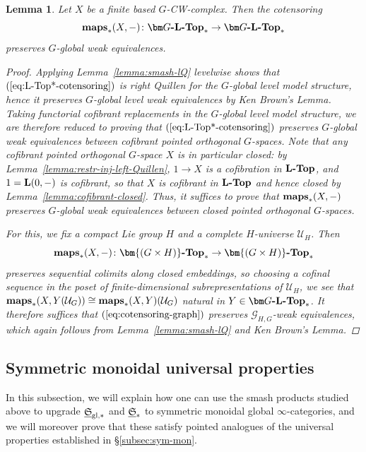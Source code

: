 \documentclass[reqno]{memo-l}
\theoremstyle{mythm}
\newtheorem{lemma}[thm]{Lemma}
\theoremstyle{definition}
\numberwithin{equation}{section}
\newcommand{\Uu}{{\mathcal{U}}}
\newcommand{\gl}{\textup{gl}}
\newcommand{\cat}[1]{\textbf{\textup{#1}}}
\newcommand{\maps}{\cat{maps}}
\newcommand{\ulhelper}[2]{\underline{\setbox0=\hbox{$#1#2$}\dp0=0.4pt \box0\relax}}
\newcommand{\ul}[1]{{\mathpalette\ulhelper{#1}}\hbox{\rule[-2pt]{0pt}{0pt}}}
\newcommand{\myS}{{{\mathfrak S\kern-.4pt}}}
\begin{document}
\begin{lemma}\label{lemma:cotensoring-fully-homotopical}
    Let $X$ be a finite based $G$-CW-complex. Then the cotensoring 
    \begin{equation}\label{eq:L-Top*-cotensoring}
        \maps_*(X,-)\colon\cat{$\bm G$-$\cat{L}$-Top}_*\to\cat{$\bm G$-$\cat{L}$-Top}_*
    \end{equation}
    preserves $G$-global weak equivalences. 
    \begin{proof}
        Applying Lemma~\ref{lemma:smash-lQ} levelwise shows that $(\ref{eq:L-Top*-cotensoring})$ is right Quillen for the $G$-global \emph{level} model structure, hence it preserves $G$-global level weak equivalences by Ken Brown's Lemma. Taking functorial cofibrant replacements in the $G$-global level model structure, we are therefore reduced to proving that $(\ref{eq:L-Top*-cotensoring})$ preserves $G$-global weak equivalences between cofibrant pointed orthogonal $G$-spaces. Note that any cofibrant pointed orthogonal $G$-space $X$ is in particular closed: by Lemma~\ref{lemma:restr-inj-left-Quillen}, $1\to X$ is a cofibration in $\cat{$\cat{L}$-Top}$, and $1=\cat{L}(0,-)$ is cofibrant, so that $X$ is cofibrant in $\cat{$\cat{L}$-Top}$ and hence closed by Lemma~\ref{lemma:cofibrant-closed}. Thus, it suffices to prove that $\maps_*(X,-)$ preserves $G$-global weak equivalences between closed pointed orthogonal $G$-spaces.

        For this, we fix a compact Lie group $H$ and a complete $H$-universe $\Uu_H$. Then 
        \begin{equation}\label{eq:cotensoring-graph}
            \maps_*(X,-)\colon\cat{$\bm{(G\times H)}$-Top}_*\to\cat{$\bm{(G\times H)}$-Top}_*
        \end{equation}
        preserves sequential colimits along closed embeddings, so choosing a cofinal sequence in the poset of finite-dimensional subrepresentations of $\Uu_H$, we see that $\maps_*(X,Y(\Uu_G))\cong\maps_*(X,Y)(\Uu_G)$ natural in $Y\in\cat{$\bm G$-$\cat{L}$-Top}_*$. It therefore suffices that $(\ref{eq:cotensoring-graph})$ preserves $\mathcal G_{H,G}$-weak equivalences, which again follows from Lemma~\ref{lemma:smash-lQ} and Ken Brown's Lemma.
    \end{proof}
\end{lemma}

\subsection{Symmetric monoidal universal properties}\label{subsec:pointed-sym-mon} In this subsection, we will explain how one can use the smash products studied above to upgrade $\ul\myS_{\gl,*}$ and $\ul\myS_*$ to symmetric monoidal global $\infty$-categories, and we will moreover prove that these satisfy pointed analogues of the universal properties established in §\ref{subsec:sym-mon}. 
\end{document}
